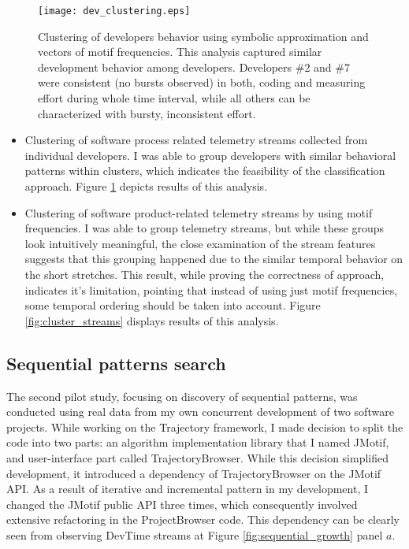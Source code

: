 \begin{figure}[tbp]
   \centering
   \texttt{[image: dev\_clustering.eps]}
   \caption{Clustering of developers behavior using symbolic approximation and vectors of motif frequencies. This analysis captured similar development behavior among developers. Developers \#2 and \#7 were consistent (no bursts observed) in both, coding and measuring effort during whole time interval, while all others can be characterized with bursty, inconsistent effort.}
   \label{fig:cluster_developers}
\end{figure}

\begin{itemize}
	\item Clustering of software process related telemetry streams collected from individual developers. I was able to group developers with similar behavioral patterns within clusters, which indicates the feasibility of the classification approach. Figure \ref{fig:cluster_developers} depicts results of this analysis.
	\item Clustering of software product-related telemetry streams by using motif frequencies. I was able to group telemetry streams, but while these groups look intuitively meaningful, the close examination of the stream features suggests that this grouping happened due to the similar temporal behavior on the short stretches. This result, while proving the correctness of approach, indicates it's limitation, pointing that instead of using just motif frequencies, some temporal ordering should be taken into account. Figure \ref{fig:cluster_streams} displays results of this analysis.
\end{itemize}

\subsection{Sequential patterns search}
The second pilot study, focusing on discovery of sequential patterns, was conducted using real data from my own concurrent development of two software projects. While working on the Trajectory framework, I made decision to split the code into two parts: an algorithm implementation library that I named JMotif, and user-interface part called TrajectoryBrowser. While this decision simplified development, it introduced a dependency of TrajectoryBrowser on the JMotif API. As a result of iterative and incremental pattern in my development, I changed the JMotif public API three times, which consequently involved extensive refactoring in the ProjectBrowser code. This dependency can be clearly seen from observing DevTime streams at Figure \ref{fig:sequential_growth} panel $a$. 

